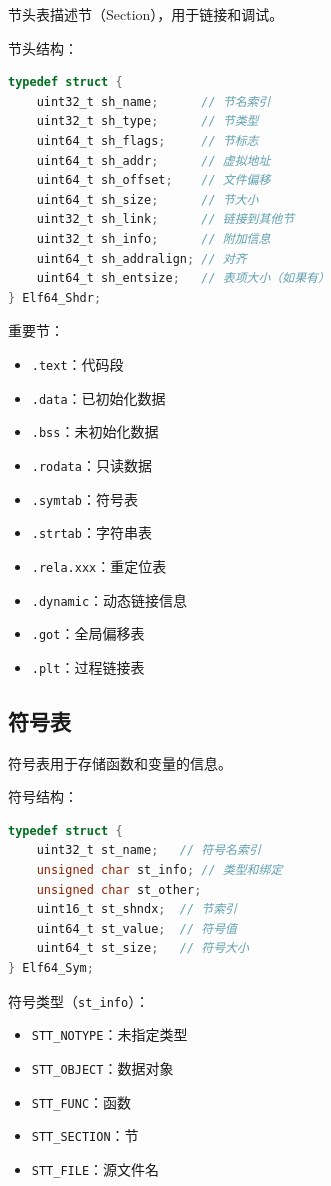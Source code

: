 
节头表描述节（Section），用于链接和调试。

节头结构：
\begin{lstlisting}[language=C]
typedef struct {
    uint32_t sh_name;      // 节名索引
    uint32_t sh_type;      // 节类型
    uint64_t sh_flags;     // 节标志
    uint64_t sh_addr;      // 虚拟地址
    uint64_t sh_offset;    // 文件偏移
    uint64_t sh_size;      // 节大小
    uint32_t sh_link;      // 链接到其他节
    uint32_t sh_info;      // 附加信息
    uint64_t sh_addralign; // 对齐
    uint64_t sh_entsize;   // 表项大小（如果有）
} Elf64_Shdr;
\end{lstlisting}

重要节：
\begin{itemize}
  \item \texttt{.text}：代码段
  \item \texttt{.data}：已初始化数据
  \item \texttt{.bss}：未初始化数据
  \item \texttt{.rodata}：只读数据
  \item \texttt{.symtab}：符号表
  \item \texttt{.strtab}：字符串表
  \item \texttt{.rela.xxx}：重定位表
  \item \texttt{.dynamic}：动态链接信息
  \item \texttt{.got}：全局偏移表
  \item \texttt{.plt}：过程链接表
\end{itemize}

\subsection{符号表}


符号表用于存储函数和变量的信息。

符号结构：
\begin{lstlisting}[language=C]
typedef struct {
    uint32_t st_name;   // 符号名索引
    unsigned char st_info; // 类型和绑定
    unsigned char st_other;
    uint16_t st_shndx;  // 节索引
    uint64_t st_value;  // 符号值
    uint64_t st_size;   // 符号大小
} Elf64_Sym;
\end{lstlisting}

符号类型（\lstinline!st_info!）：
\begin{itemize}
  \item \texttt{STT\_NOTYPE}：未指定类型
  \item \texttt{STT\_OBJECT}：数据对象
  \item \texttt{STT\_FUNC}：函数
  \item \texttt{STT\_SECTION}：节
  \item \texttt{STT\_FILE}：源文件名
\end{itemize}

